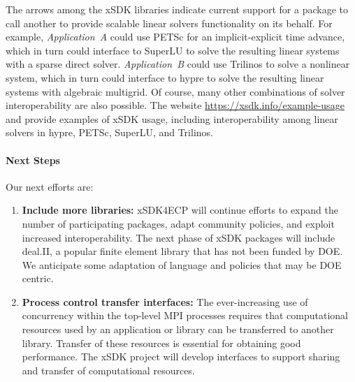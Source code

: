 The arrows among
the xSDK libraries indicate current support for
a package to call another to provide scalable linear solvers
functionality on its behalf.  For example, {\em Application~A} could
use PETSc for an implicit-explicit time advance, which in turn could
interface to SuperLU to solve the resulting linear systems with a
sparse direct solver.  {\em Application~B} could use Trilinos to solve
a nonlinear system, which in turn could interface to hypre to solve
the resulting linear systems with algebraic multigrid.  Of course,
many other combinations of solver interoperability are also possible.
The website \url{https://xsdk.info/example-usage}
and \cite{Klinvex-xSDKTrilinos} provide examples of
xSDK usage, including interoperability among linear solvers in hypre,
PETSc, SuperLU, and Trilinos.


\paragraph{Next Steps}


Our next efforts are:
\begin{enumerate}
	\item \textbf{Include more libraries:} xSDK4ECP will continue efforts to expand the number of participating packages, adapt community policies, and exploit increased interoperability.  The next phase of xSDK packages will include deal.II, a popular finite element library that has not been funded by DOE.  We anticipate some adaptation of language and policies that may be DOE centric.
	
		\item \textbf{Process control transfer interfaces:} The ever-increasing use of concurrency within the top-level MPI processes requires that computational resources used by an application or library can be transferred to another library. Transfer of these resources is essential for obtaining good performance.  The xSDK project will develop interfaces to support sharing and transfer of computational resources.
	
\end{enumerate}
